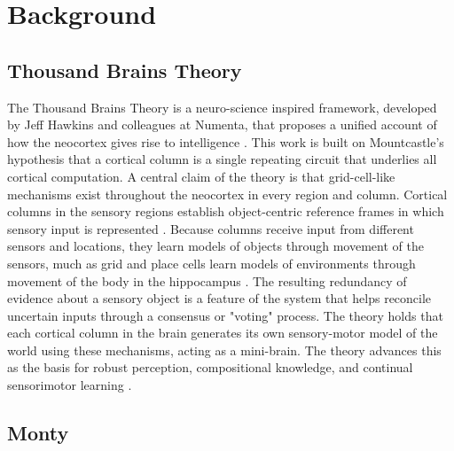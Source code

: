 \documentclass[runningheads]{llncs}
\begin{document}
\section{Background}
\subsection{Thousand Brains Theory}

The Thousand Brains Theory is a neuro-science inspired framework, developed by Jeff Hawkins and colleagues at Numenta, that proposes a unified account of how the neocortex gives rise to intelligence \cite{hawkins_framework_2019,hawkins2021thousand}. This work is built on Mountcastle's \cite{mountcastle_columnar_1997} hypothesis that a cortical column is a single repeating circuit that underlies all cortical computation. A central claim of the theory is that grid-cell-like mechanisms exist throughout the neocortex in every region and column. Cortical columns in the sensory regions establish object-centric reference frames in which sensory input is represented \cite{hawkins_framework_2019}. Because columns receive input from different sensors and locations, they learn models of objects through movement of the sensors, much as grid and place cells learn models of environments through movement of the body in the hippocampus \cite{hafting2005MicrostructureSpatialMap}. The resulting redundancy of evidence about a sensory object is a feature of the system that helps reconcile uncertain inputs through a consensus or "voting" process. The theory holds that each cortical column in the brain generates its own sensory-motor model of the world using these mechanisms, acting as a mini-brain. The theory advances this as the basis for robust perception, compositional knowledge, and continual sensorimotor learning \cite{hawkins2017theory,hawkins_framework_2019}. 

\subsection{Monty}
\end{document}
